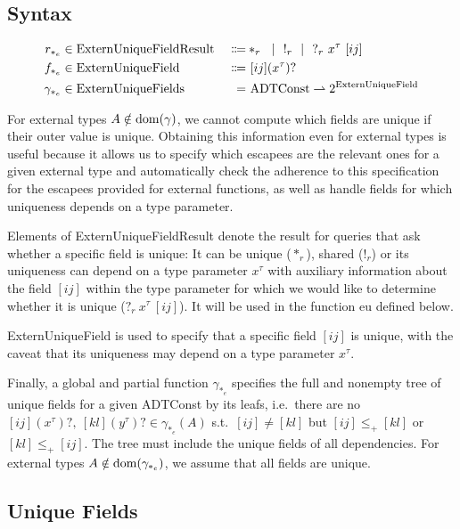 \newcommand{\ExternUniqueFieldResult}{\mathrm{ExternUniqueFieldResult}}
\newcommand{\ExternUniqueField}{\mathrm{ExternUniqueField}}
\newcommand{\ExternUniqueFields}{\mathrm{ExternUniqueFields}}

\subsection{Syntax}

\begin{alignat*}{3}
	r_{*_e} &\in \ExternUniqueFieldResult\ &\Coloneqq& *_r \sep !_r \sep ?_r\ x^\tau\ [ij] \\
	f_{*_e} &\in \ExternUniqueField\ &\Coloneqq&\ [ij] (x^\tau)? \\
	\gamma_{*_e} &\in \ExternUniqueFields\ &=&\ \ADTConst \rightharpoonup 2^{\ExternUniqueField}
\end{alignat*}

For external types $A \notin \mathrm{dom}(\gamma)$, we cannot compute which fields are unique if their outer value is unique. Obtaining this information even for external types is useful because it allows us to specify which escapees are the relevant ones for a given external type and automatically check the adherence to this specification for the escapees provided for external functions, as well as handle fields for which uniqueness depends on a type parameter.

Elements of ExternUniqueFieldResult denote the result for queries that ask whether a specific field is unique: It can be unique ($*_r$), shared ($!_r$) or its uniqueness can depend on a type parameter $x^\tau$ with auxiliary information about the field $[ij]$ within the type parameter for which we would like to determine whether it is unique ($?_r\ x^\tau\ [ij]$). It will be used in the function eu defined below. 

ExternUniqueField is used to specify that a specific field $[ij]$ is unique, with the caveat that its uniqueness may depend on a type parameter $x^\tau$. 

Finally, a global and partial function $\gamma_{*_e}$ specifies the full and nonempty tree of unique fields for a given ADTConst by its leafs, i.e.\ there are no $[ij] (x^\tau)?,\ [kl] (y^\tau)? \in \gamma_{*_e}(A)$ s.t.\ $[ij] \neq [kl]$ but $[ij] \leq_+ [kl]$ or $[kl] \leq_+ [ij]$. The tree must include the unique fields of all dependencies. For external types $A \notin \mathrm{dom}(\gamma_{*_e})$, we assume that all fields are unique.

\subsection{Unique Fields}
